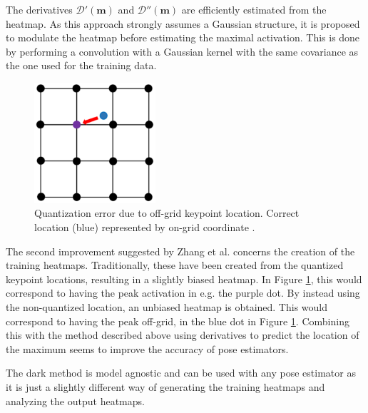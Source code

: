 The derivatives $\mathcal{D'}(\pmb{m})$ and $\mathcal{D''}(\pmb{m})$ are efficiently estimated from the heatmap. As this approach strongly assumes a Gaussian structure, it is proposed to modulate the heatmap before estimating the maximal activation. This is done by performing a convolution with a Gaussian kernel with the same covariance as the one used for the training data.

\begin{figure}[H]
  \centering
  \includegraphics[width=0.4\textwidth]{files/figs/hpe/quantization.png}
  \caption{Quantization error due to off-grid keypoint location. Correct location (blue) represented by on-grid coordinate \cite{Zhang2020}.}
  \label{fig:pixel-quantization}
\end{figure}

The second improvement suggested by Zhang et al. concerns the creation of the training heatmaps. Traditionally, these have been created from the quantized keypoint locations, resulting in a slightly biased heatmap. In Figure \ref{fig:pixel-quantization}, this would correspond to having the peak activation in e.g. the purple dot. By instead using the non-quantized location, an unbiased heatmap is obtained. This would correspond to having the peak off-grid, in the blue dot in Figure \ref{fig:pixel-quantization}. Combining this with the method described above using derivatives to predict the location of the maximum seems to improve the accuracy of pose estimators.

The \gls{dark} method is model agnostic and can be used with any pose estimator as it is just a slightly different way of generating the training heatmaps and analyzing the output heatmaps.


